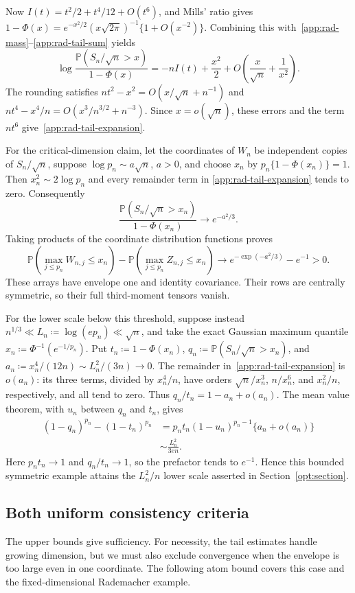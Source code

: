 \documentclass[11pt,letterpaper]{article}
\theoremstyle{remark}
\newcommand{\Pp}{\mathbb P}
\begin{document}
Now \(I(t)=t^2/2+t^4/12+O(t^6)\), and Mills' ratio gives
\(1-\Phi(x)=e^{-x^2/2}(x\sqrt{2\pi})^{-1}\{1+O(x^{-2})\}\).
Combining this with~\eqref{app:rad-mass}--\eqref{app:rad-tail-sum}
yields
\[
 \log\frac{\Pp(S_n/\sqrt n>x)}{1-\Phi(x)}
 =-nI(t)+\frac{x^2}{2}
       +O\!\left(\frac{x}{\sqrt n}+\frac1{x^2}\right).
\]
The rounding satisfies
\(nt^2-x^2=O(x/\sqrt n+n^{-1})\) and
\(nt^4-x^4/n=O(x^3/n^{3/2}+n^{-3})\).
Since \(x=o(\sqrt n)\), these errors and the term \(nt^6\)
give~\eqref{app:rad-tail-expansion}.

For the critical-dimension claim, let the coordinates of \(W_n\)
be independent copies of \(S_n/\sqrt n\), suppose
\(\log p_n\sim a\sqrt n\), \(a>0\), and choose \(x_n\) by
\(p_n\{1-\Phi(x_n)\}=1\). Then
\(x_n^2\sim2\log p_n\) and every remainder term in
\eqref{app:rad-tail-expansion} tends to zero. Consequently
\[
 \frac{\Pp(S_n/\sqrt n>x_n)}{1-\Phi(x_n)}
 \longrightarrow e^{-a^2/3}.
\]
Taking products of the coordinate distribution functions proves
\begin{equation}
 \Pp(\max_{j\le p_n}W_{n,j}\le x_n)
 -\Pp(\max_{j\le p_n}Z_{n,j}\le x_n)
 \longrightarrow e^{-\exp(-a^2/3)}-e^{-1}>0.
 \label{app:rad-critical}
\end{equation}
These arrays have envelope one and identity covariance. Their rows
are centrally symmetric, so their full third-moment tensors vanish.

For the lower scale below this threshold, suppose instead
\(n^{1/3}\ll L_n\coloneqq\log(ep_n)\ll\sqrt n\), and take the exact
Gaussian maximum quantile \(x_n\coloneqq\Phi^{-1}(e^{-1/p_n})\).
Put \(t_n\coloneqq1-\Phi(x_n)\),
\(q_n\coloneqq\Pp(S_n/\sqrt n>x_n)\), and
\(a_n\coloneqq x_n^4/(12n)\sim L_n^2/(3n)\to0\).
The remainder in~\eqref{app:rad-tail-expansion} is \(o(a_n)\): its
three terms, divided by \(x_n^4/n\), have orders
\(\sqrt n/x_n^3\), \(n/x_n^6\), and \(x_n^2/n\), respectively,
and all tend to zero. Thus \(q_n/t_n=1-a_n+o(a_n)\).
The mean value theorem, with \(u_n\) between \(q_n\) and \(t_n\), gives
\begin{align*}
 (1-q_n)^{p_n}-(1-t_n)^{p_n}
 &=p_nt_n(1-u_n)^{p_n-1}\{a_n+o(a_n)\}\\
 &\sim\frac{L_n^2}{3en}.
\end{align*}
Here \(p_nt_n\to1\) and \(q_n/t_n\to1\), so the prefactor tends
to \(e^{-1}\). Hence this bounded symmetric example attains the
\(L_n^2/n\) lower scale asserted in Section~\ref{opt:section}.

\subsection{Both uniform consistency criteria}
\label{app:consistency-proof}
The upper bounds give sufficiency. For necessity, the tail estimates
handle growing dimension, but we must also exclude convergence when
the envelope is too large even in one coordinate. The following atom
bound covers this case and the fixed-dimensional Rademacher example.
\end{document}

